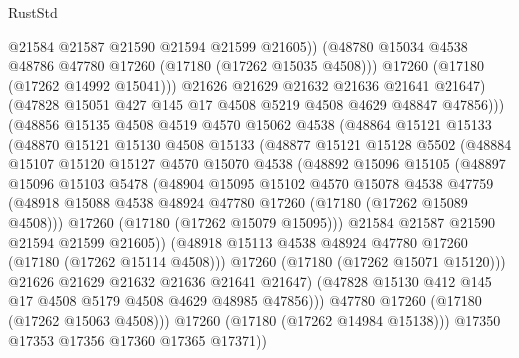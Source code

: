 \begin{lexlean}{RustStd}
\begin{coremodule}
                      @21584
                      @21587
                      @21590
                      @21594
                      @21599
                      @21605))
                  (@48780 @15034 @4538 @48786 @47780 @17260 (@17180 (@17262 @15035 @4508)))
                  @17260
                  (@17180 (@17262 @14992 @15041)))
                @21626
                @21629
                @21632
                @21636
                @21641
                @21647)
              (@47828 @15051 @427 @145 @17 @4508 @5219 @4508 @4629 @48847 @47856)))
          (@48856
            @15135
            @4508
            @4519
            @4570
            @15062
            @4538
            (@48864
              @15121
              @15133
              (@48870
                @15121
                @15130
                @4508
                @15133
                (@48877
                  @15121
                  @15128
                  @5502
                  (@48884
                    @15107
                    @15120
                    @15127
                    @4570
                    @15070
                    @4538
                    (@48892
                      @15096
                      @15105
                      (@48897
                        @15096
                        @15103
                        @5478
                        (@48904
                          @15095
                          @15102
                          @4570
                          @15078
                          @4538
                          @47759
                          (@48918 @15088 @4538 @48924 @47780 @17260 (@17180 (@17262 @15089 @4508)))
                          @17260
                          (@17180 (@17262 @15079 @15095)))
                        @21584
                        @21587
                        @21590
                        @21594
                        @21599
                        @21605))
                    (@48918 @15113 @4538 @48924 @47780 @17260 (@17180 (@17262 @15114 @4508)))
                    @17260
                    (@17180 (@17262 @15071 @15120)))
                  @21626
                  @21629
                  @21632
                  @21636
                  @21641
                  @21647)
                (@47828 @15130 @412 @145 @17 @4508 @5179 @4508 @4629 @48985 @47856)))
            @47780
            @17260
            (@17180 (@17262 @15063 @4508)))
          @17260
          (@17180 (@17262 @14984 @15138)))
        @17350
        @17353
        @17356
        @17360
        @17365
        @17371))

\end{coremodule}
\end{lexlean}

